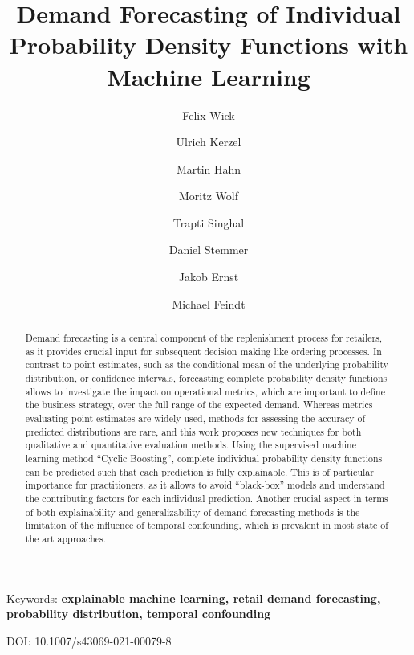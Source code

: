 \documentclass[BCOR=1mm, DIV=calc,10pt,
twoside=true,
twocolumn,
headings=normal]{scrartcl}
\begin{document}
\title{Demand Forecasting of Individual Probability Density Functions with Machine Learning}

\author[1]{Felix Wick}
\author[3]{Ulrich Kerzel}
\author[1]{Martin Hahn}
\author[1]{Moritz Wolf}
\author[2]{Trapti Singhal}
\author[1]{Daniel Stemmer}
\author[1]{Jakob Ernst}
\author[1]{Michael Feindt}

\date{}

\maketitle


\begin{abstract}

Demand forecasting is a central component of the replenishment process for retailers, as it provides crucial input for subsequent decision making like ordering processes. In contrast to point estimates, such as the conditional mean of the underlying probability distribution, or confidence intervals, forecasting complete probability density functions allows to investigate the impact on operational metrics, which are important to define the business strategy, over the full range of the expected demand. Whereas metrics evaluating point estimates are widely used, methods for assessing the accuracy of predicted distributions are rare, and this work proposes new techniques for both qualitative and quantitative evaluation methods. Using the supervised machine learning method ``Cyclic Boosting'', complete individual probability density functions can be predicted such that each prediction is fully explainable. This is of particular importance for practitioners, as it allows to avoid ``black-box'' models and understand the contributing factors for each individual prediction. Another crucial aspect in terms of both explainability and generalizability of demand forecasting methods is the limitation of the influence of temporal confounding, which is prevalent in most state of the art approaches.

\end{abstract}

{Keywords: \textbf{explainable machine learning, retail demand forecasting, probability distribution, temporal confounding}}

{DOI: 10.1007/s43069-021-00079-8}
\end{document}
